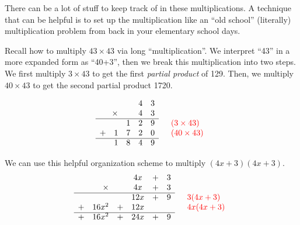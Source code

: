 There can be a lot of stuff to keep track of in these multiplications. A technique that can be helpful is to set up the multiplication like an ``old school'' (literally) multiplication problem from back in your elementary school days.

Recall how to multiply $43 \times 43$ via long ``multiplication''. We interpret ``43'' in a more expanded form as ``40+3'', then we break this multiplication into two steps. We first multiply $3\times43$ to get the first \textit{partial product} of 129. Then, we multiply $40\times43$ to get the second partial product 1720.

\[\begin{array}{rcccl}
		&	& 4	& 3&\\
\times	&	& 4	& 3&\\
\cline{1-4}
			& 1	& 2	& 9&\quad{\color{red}(3\times43)}\\
+\quad1	& 7	& 2	& 0&\quad{\color{red}(40\times43)}\\
\cline{1-4}
1 & 8 & 4 & 9&
\end{array}\]


We can use this helpful organization scheme to multiply $(4x+3)(4x+3)$.
\[\begin{array}{rccccl}
		&	& 4x & + & 3&\\
\times	&	& 4x & + & 3&\\
\cline{1-5}
&&12x&+&9&\quad{\color{red}3(4x+3)}\\
+\quad16x^2&+& 12x&&&\quad{\color{red}4x(4x+3)}\\
\cline{1-5}
+\quad16x^2&+& 24x&+&9&\\
\end{array}\]

